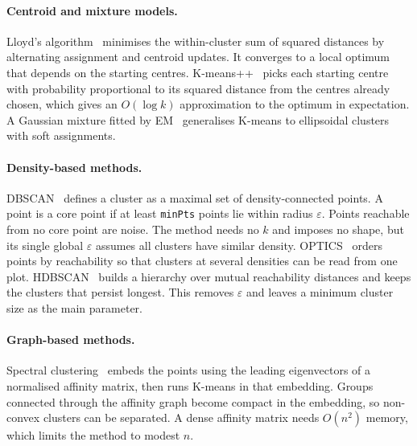 \paragraph{Centroid and mixture models.} Lloyd's algorithm~\cite{lloyd1982}
minimises the within-cluster sum of squared distances by alternating assignment and
centroid updates. It converges to a local optimum that depends on the starting
centres. K-means++~\cite{arthur2007} picks each starting centre with probability
proportional to its squared distance from the centres already chosen, which gives an
$O(\log k)$ approximation to the optimum in expectation. A Gaussian mixture fitted by
EM~\cite{dempster1977} generalises K-means to ellipsoidal clusters with soft
assignments.

\paragraph{Density-based methods.} DBSCAN~\cite{ester1996} defines a cluster as a
maximal set of density-connected points. A point is a core point if at least
\texttt{minPts} points lie within radius $\varepsilon$. Points reachable from no core
point are noise. The method needs no $k$ and imposes no shape, but its single global
$\varepsilon$ assumes all clusters have similar density. OPTICS~\cite{ankerst1999}
orders points by reachability so that clusters at several densities can be read from
one plot. HDBSCAN~\cite{campello2013} builds a hierarchy over mutual reachability
distances and keeps the clusters that persist longest. This removes $\varepsilon$ and
leaves a minimum cluster size as the main parameter.

\paragraph{Graph-based methods.} Spectral clustering~\cite{ng2002} embeds the points
using the leading eigenvectors of a normalised affinity matrix, then runs K-means in
that embedding. Groups connected through the affinity graph become compact in the
embedding, so non-convex clusters can be separated. A dense affinity matrix needs
$O(n^2)$ memory, which limits the method to modest $n$.

